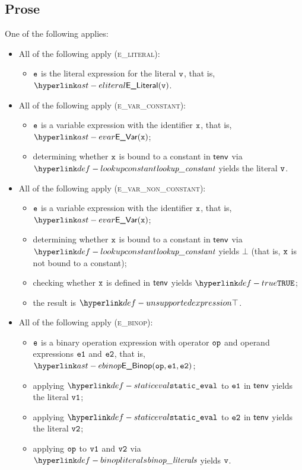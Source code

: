 \subsection{Prose}
One of the following applies:
\begin{itemize}
  \item All of the following apply (\textsc{e\_literal}):
  \begin{itemize}
    \item $\texttt{e}$ is the literal expression for the literal $\texttt{v}$, that is, $\ELiteral(\vv)$.
  \end{itemize}

  \item All of the following apply (\textsc{e\_var\_constant}):
  \begin{itemize}
    \item $\texttt{e}$ is a variable expression with the identifier $\texttt{x}$, that is, $\EVar(\vx)$;
    \item determining whether $\texttt{x}$ is bound to a constant in $\textsf{tenv}$ via $\lookupconstant$ yields the literal $\texttt{v}$.
  \end{itemize}

  \item All of the following apply (\textsc{e\_var\_non\_constant}):
  \begin{itemize}
    \item $\texttt{e}$ is a variable expression with the identifier $\texttt{x}$, that is, $\EVar(\vx)$;
    \item determining whether $\texttt{x}$ is bound to a constant in $\textsf{tenv}$ via $\lookupconstant$ yields $\bot$
          (that is, $\texttt{x}$ is not bound to a constant);
    \item checking whether $\texttt{x}$ is defined in $\textsf{tenv}$ yields $\True$\ProseOrTypeError;
    \item the result is $\CannotBeTransformed$.
  \end{itemize}

  \item All of the following apply (\textsc{e\_binop}):
  \begin{itemize}
    \item $\texttt{e}$ is a binary operation expression with operator $\texttt{op}$ and operand expressions $\texttt{e1}$ and $\texttt{e2}$,
          that is, $\EBinop(\op, \veone, \vetwo)$;
    \item applying $\staticeval$ to $\texttt{e1}$ in $\textsf{tenv}$ yields the literal $\texttt{v1}$\ProseTerminateAs{\CannotBeTransformed, \TypeErrorConfig};
    \item applying $\staticeval$ to $\texttt{e2}$ in $\textsf{tenv}$ yields the literal $\texttt{v2}$\ProseTerminateAs{\CannotBeTransformed, \TypeErrorConfig};
    \item applying $\texttt{op}$ to $\texttt{v1}$ and $\texttt{v2}$ via $\binopliterals$ yields $\texttt{v}$\ProseOrTypeError.
  \end{itemize}


\end{itemize}
